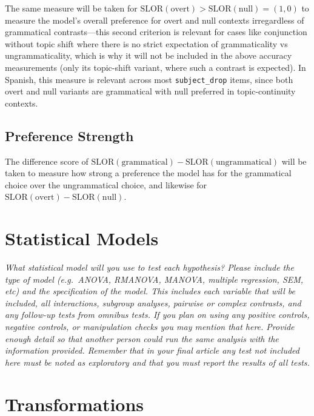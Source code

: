 \documentclass[12pt]{article}
\begin{document}
The same measure will be taken for $\text{SLOR}(\text{overt}) > \text{SLOR}(\text{null}) = (1,0)$ to measure the model's overall preference for overt and null contexts irregardless of grammatical contrasts---this second criterion is relevant for cases like conjunction without topic shift where there is no strict expectation of grammaticality vs ungrammaticality, which is why it will not be included in the above accuracy measurements (only its topic-shift variant, where such a contrast is expected). In Spanish, this measure is relevant across most \texttt{subject\_drop} items, since both overt and null variants are grammatical with null preferred in topic-continuity contexts.

\subsection{Preference Strength}

The difference score of $\text{SLOR}(\text{grammatical}) - \text{SLOR}(\text{ungrammatical})$ will be taken to measure how strong a preference the model has for the grammatical choice over the ungrammatical choice, and likewise for $\text{SLOR}(\text{overt}) - \text{SLOR}(\text{null})$.

\section{Statistical Models}

\textit{What statistical model will you use to test each hypothesis? Please include the type of model (e.g.\ ANOVA, RMANOVA, MANOVA, multiple regression, SEM, etc) and the specification of the model. This includes each variable that will be included, all interactions, subgroup analyses, pairwise or complex contrasts, and any follow-up tests from omnibus tests. If you plan on using any positive controls, negative controls, or manipulation checks you may mention that here. Provide enough detail so that another person could run the same analysis with the information provided. Remember that in your final article any test not included here must be noted as exploratory and that you must report the results of all tests.}

\section{Transformations}
\end{document}
